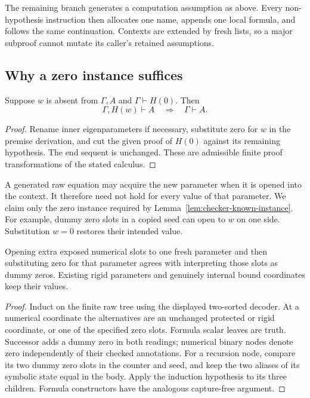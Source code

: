 The remaining branch generates a computation assumption as above.
Every non-hypothesis instruction then allocates one name, appends one
local formula, and follows the same continuation. Contexts are extended
by fresh lists, so a major subproof cannot mutate its caller's retained
assumptions.

\subsection{Why a zero instance suffices}

\begin{lemma}\label{lem:checker-known-instance}
Suppose $w$ is absent from $\Gamma,A$ and
$\Gamma\vdash H(0)$. Then
\[
          \Gamma,H(w)\vdash A\quad\Longrightarrow\quad\Gamma\vdash A.
\]
\end{lemma}
\begin{proof}
Rename inner eigenparameters if necessary, substitute zero for $w$ in
the premise derivation, and cut the given proof of $H(0)$ against its
remaining hypothesis. The end sequent is unchanged. These are admissible
finite proof transformations of the stated calculus.
\end{proof}

A generated raw equation may acquire the new parameter when it is
opened into the context. It therefore need not hold for every value of
that parameter. We claim only the zero instance required by
Lemma~\ref{lem:checker-known-instance}. For example, dummy zero slots
in a copied seed can open to $w$ on one side. Substitution $w=0$
restores their intended value.

\begin{lemma}\label{lem:checker-zero}
Opening extra exposed numerical slots to one fresh parameter and then
substituting zero for that parameter agrees with interpreting those
slots as dummy zeros. Existing rigid parameters and genuinely internal
bound coordinates keep their values.
\end{lemma}
\begin{proof}
Induct on the finite raw tree using the displayed two-sorted decoder.
At a numerical coordinate the alternatives are an unchanged protected
or rigid coordinate, or one of the specified zero slots. Formula scalar
leaves are truth. Successor adds a dummy zero in both readings; numerical
binary nodes denote zero independently of their checked annotations.
For a recursion node, compare its two dummy zero slots in the counter
and seed, and keep the two aliases of its symbolic state equal in the
body. Apply the induction hypothesis to its three children. Formula
constructors have the analogous capture-free argument.
\end{proof}

